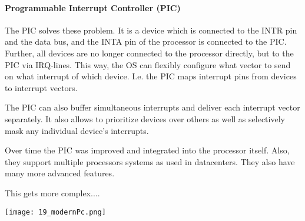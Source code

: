 \paragraph{Programmable Interrupt Controller (PIC)}
The PIC solves these problem. It is a device which is connected to the INTR pin and the data bus, and the INTA pin of the processor is connected to the PIC. Further, all devices are no longer connected to the processor directly, but to the PIC via IRQ-lines. This way, the OS can flexibly configure what vector to send on what interrupt of which device. I.e. the PIC maps interrupt pins from devices to interrupt vectors.

The PIC can also buffer simultaneous interrupts and deliver each interrupt vector separately. It also allows to prioritize devices over others as well as selectively mask any individual device's interrupts.

Over time the PIC was improved and integrated into the processor itself. Also, they support multiple processors systems as used in datacenters. They also have many more advanced features. 

This gets more complex....

\texttt{[image: 19\_modernPc.png]}
